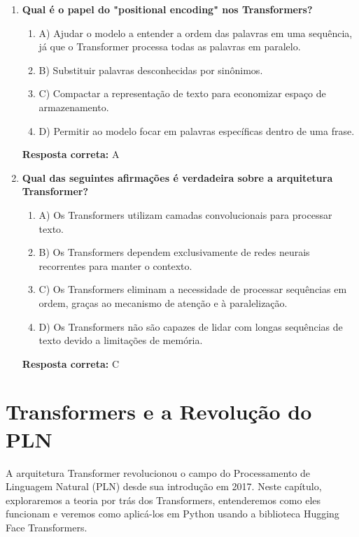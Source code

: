 \documentclass[14pt,a4paper,oneside]{book}
\begin{document}
\begin{enumerate}
	\item \textbf{Qual é o papel do "positional encoding" nos Transformers?}
	\begin{enumerate}[label=\alph*)]
		\item A) Ajudar o modelo a entender a ordem das palavras em uma sequência, já que o Transformer processa todas as palavras em paralelo.
		\item B) Substituir palavras desconhecidas por sinônimos.
		\item C) Compactar a representação de texto para economizar espaço de armazenamento.
		\item D) Permitir ao modelo focar em palavras específicas dentro de uma frase.
	\end{enumerate}
	\vspace{5mm}
	\textbf{Resposta correta:} A
	
	\item \textbf{Qual das seguintes afirmações é verdadeira sobre a arquitetura Transformer?}
	\begin{enumerate}[label=\alph*)]
		\item A) Os Transformers utilizam camadas convolucionais para processar texto.
		\item B) Os Transformers dependem exclusivamente de redes neurais recorrentes para manter o contexto.
		\item C) Os Transformers eliminam a necessidade de processar sequências em ordem, graças ao mecanismo de atenção e à paralelização.
		\item D) Os Transformers não são capazes de lidar com longas sequências de texto devido a limitações de memória.
	\end{enumerate}
	\vspace{5mm}
	\textbf{Resposta correta:} C
	
\end{enumerate}

%


\chapter{Transformers e a Revolução do PLN}

A arquitetura Transformer revolucionou o campo do Processamento de Linguagem Natural (PLN) desde sua introdução em 2017. Neste capítulo, exploraremos a teoria por trás dos Transformers, entenderemos como eles funcionam e veremos como aplicá-los em Python usando a biblioteca Hugging Face Transformers.
\end{document}
